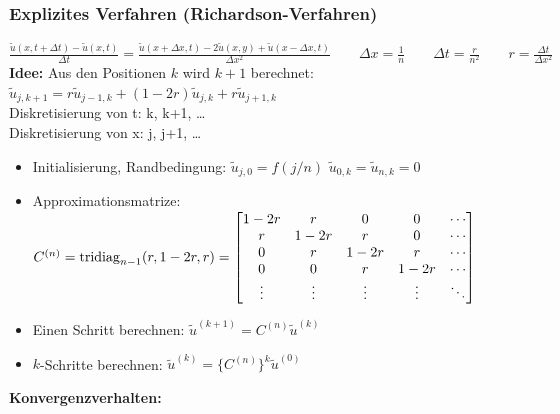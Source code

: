 \newpage

\subsubsection{Explizites Verfahren (Richardson-Verfahren)}
$\boxed{\frac{\tilde{u}(x,t+\Delta t) - \tilde{u}(x,t)}{\Delta t} =
\frac{\tilde{u}(x+\Delta x, t)-2\tilde{u}(x,y) + \tilde{u}( x - \Delta x, t )} {\Delta x^2}} \qquad \Delta x=\frac{1}{n} \qquad \Delta t=\frac{r}{n^2} \qquad \boxed{r=\frac{\Delta
t}{\Delta x^2}}$\\

\textbf{Idee:} Aus den Positionen $k$ wird $k+1$ berechnet: $\tilde{u}_{j,k+1} = r \tilde{u}_{j-1,k} + (1-2r)\tilde{u}_{j,k} + r \tilde{u}_{j+1,k}$\\
Diskretisierung von t: k, k+1, \ldots\\
Diskretisierung von x: j, j+1, \ldots\\

\begin{itemize}
\item Initialisierung, Randbedingung: $\tilde{u}_{j,0}=f(j/n)$ \qquad $\tilde{u}_{0,k}=\tilde{u}_{n,k}=0$
\item Approximationsmatrize: $C^{(n)}=\operatorname{tridiag}_{n-1}(r,1-2r,r)=\begin{bmatrix}
1-2r& r		& 0		& 0 	&\cdots\\
r	& 1-2r  & r		& 0		&\cdots\\
0	& r		& 1-2r 	& r 	&\cdots\\
0	& 0		& r		& 1-2r 	&\cdots\\
\vdots&	\vdots&\vdots&\vdots&\ddots
\end{bmatrix}$
\item Einen Schritt berechnen: $\tilde{u}^{(k+1)}=C^{(n)} \tilde{u}^{(k)}$
\item $k$-Schritte berechnen: $\tilde{u}^{(k)}=\big\{C^{(n)}\big\}^k \tilde{u}^{(0)}$
\end{itemize}

\textbf{Konvergenzverhalten:} \\

